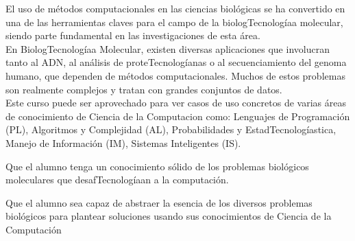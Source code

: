 \begin{syllabus}


\begin{justification}
El uso de métodos computacionales en las ciencias biológicas se ha convertido en una de las herramientas claves para el campo de la biologTecnologíaa molecular, siendo parte fundamental en las investigaciones de esta área. 
\\
En BiologTecnologíaa Molecular, existen diversas aplicaciones que involucran tanto al ADN, al análisis de proteTecnologíanas o al secuenciamiento del genoma humano, que dependen de métodos computacionales. Muchos de estos problemas son realmente complejos y tratan con grandes conjuntos de datos. 
\\
Este curso puede ser aprovechado para ver casos de uso concretos de varias áreas de conocimiento de Ciencia de la Computacion como: Lenguajes de Programación (PL), Algoritmos y Complejidad (AL), Probabilidades y EstadTecnologíastica, Manejo de Información (IM), Sistemas Inteligentes (IS).
\end{justification}

\begin{goals}
\item Que el alumno tenga un conocimiento sólido de los problemas biológicos moleculares que desafTecnologíaan a la computación.
\item Que el alumno sea capaz de abstraer la esencia de los diversos problemas biológicos para plantear soluciones usando sus conocimientos de Ciencia de la Computación
\end{goals}

\begin{outcomes}
    \item {}
    \item {}
    \item {}
\end{outcomes}

\begin{competences}
    \item {} 
    \item {}
    \item {}
\end{competences}


\end{syllabus}
